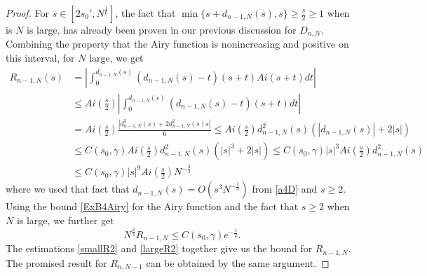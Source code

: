 \documentclass[11pt]{article}
\numberwithin{equation}{section}%
\numberwithin{theorem}{section}
\begin{document}
\begin{proof}
    For $s\in\left[2s_0',N^{\frac{1}{6}}\right]$, the fact that $\min\{s+d_{n-1,N}(s),s\}\ge\frac{s}{2}\ge1$ when is $N$ is large, has already been proven in our previous discussion for $D_{n,N}$. Combining the property that the Airy function is nonincreasing and positive on this interval, for $N$ large, we get
    \begin{equation}\label{largeR}
        \begin{split}
            R_{n-1,N}(s)&=\left|\int_0^{d_{n-1,N}(s)}(d_{n-1,N}(s)-t)(s+t)Ai(s+t)dt\right|\\&\le Ai\left(\frac{s}{2}\right)\left|\int_0^{d_{n-1,N}(s)}(d_{n-1,N}(s)-t)(s+t)dt\right|\\
            &=Ai\left(\frac{s}{2}\right)\frac{\left|d_{n-1,N}^3(s)+2d^2_{n-1,N}(s)s\right|}{6}\le Ai\left(\frac{s}{2}\right)d_{n-1,N}^2(s)\left(|d_{n-1,N}(s)|+2|s|\right)\\
            &\le  C(s_0,\gamma)Ai\left(\frac{s}{2}\right)d_{n-1,N}^2(s)\left(|s|^3+2|s|\right)\le C(s_0,\gamma)|s|^3Ai\left(\frac{s}{2}\right)d_{n-1,N}^2(s)\\
            &\le C(s_0,\gamma)|s|^9Ai\left(\frac{s}{2}\right)N^{-\frac{2}{3}}
        \end{split}
    \end{equation}
    where we used that fact that $d_{n-1,N}(s)=O\left(s^3N^{-\frac{1}{3}}\right)$ from \eqref{a4D} and $s\ge2$. Using the bound \eqref{ExB4Airy} for the Airy function and the fact that $s\ge2$ when $N$ is large, we further get
    \begin{equation}\label{largeR2}
N^\frac{2}{3}R_{n-1,N}\le C(s_0,\gamma)e^{-\frac{s}{2}}.
    \end{equation}
    The estimations \eqref{smallR2} and \eqref{largeR2} together give us the bound for $R_{n-1,N}$. The promised result for $R_{n,N-1}$ can be obtained by the same argument.
\end{proof}
\end{document}
